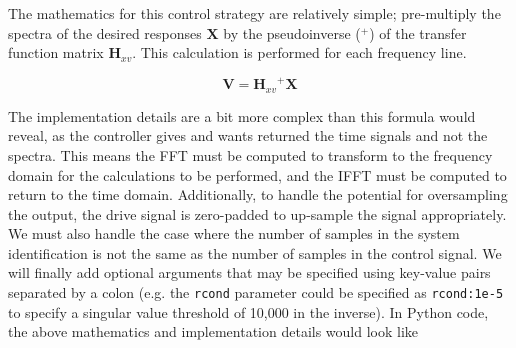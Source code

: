 \documentclass[pdf,12pt,report]{SANDreport}
\newcommand{\inlineCode}{\lstinline[basicstyle=\bfseries\ttfamily]}
\begin{document}
    The mathematics for this control strategy are relatively simple; pre-multiply the spectra of the desired responses $\mathbf{X}$ by the pseudoinverse ($^+$) of the transfer function matrix $\mathbf{H}_{xv}$.  This calculation is performed for each frequency line.
    
    \begin{equation}
        \mathbf{V} = {\mathbf{H}_{xv}}^+\mathbf{X}
    \end{equation}
    
    The implementation details are a bit more complex than this formula would reveal, as the controller gives and wants returned the time signals and not the spectra.  This means the \ac{FFT} must be computed to transform to the frequency domain for the calculations to be performed, and the \ac{IFFT} must be computed to return to the time domain.  Additionally, to handle the potential for oversampling the output, the drive signal is zero-padded to up-sample the signal appropriately.  We must also handle the case where the number of samples in the system identification is not the same as the number of samples in the control signal.  We will finally add optional arguments that may be specified using key-value pairs separated by a colon (e.g. the \inlineCode{rcond} parameter could be specified as \inlineCode{rcond:1e-5} to specify a singular value threshold of 10,000 in the inverse).  In Python code, the above mathematics and implementation details would look like
\end{document}
